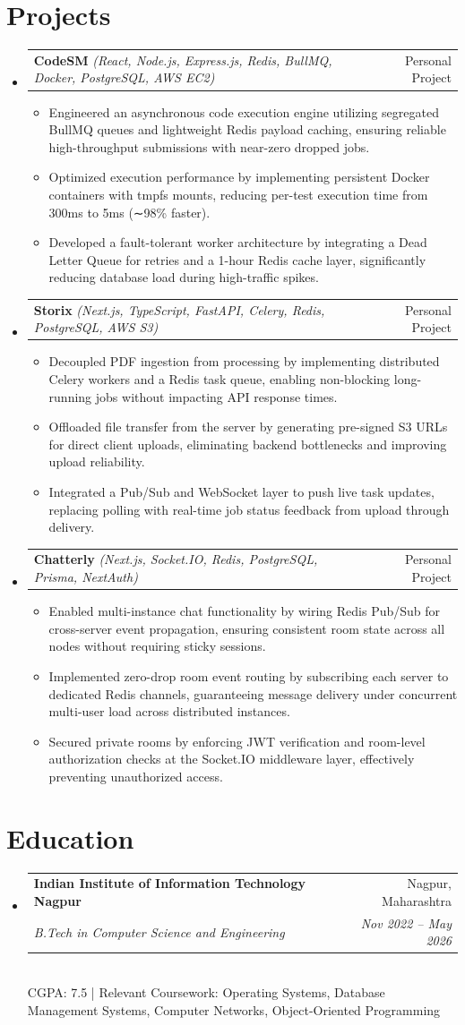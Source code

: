 \documentclass[letterpaper,10pt]{article}
\makeatletter
\newenvironment{resumeList}{
  \begin{itemize}[leftmargin=0.15in, label={}]
}{
  \end{itemize}
}
\newcommand{\resumeItem}[1]{
  \item\small{
    {#1 \vspace{-2.5pt}}
  }
}
\newcommand{\resumeSubheading}[4]{
  \vspace{-2pt}\item
    \begin{tabular*}{0.97\textwidth}[t]{l@{\extracolsep{\fill}}r}
      \textbf{#1} & #2 \\
      \textit{\small#3} & \textit{\small #4} \\
    \end{tabular*}\vspace{-6pt}
}
\newcommand{\resumeProjectHeading}[3]{
  \vspace{-2pt}\item
    \begin{tabular*}{0.97\textwidth}[t]{l@{\extracolsep{\fill}}r}
      \textbf{#1} \textit{\small(#2)} & #3 \\
    \end{tabular*}\vspace{-6pt}
}
\newcommand{\resumeItemListStart}{\begin{itemize}[leftmargin=0.15in]}
\newcommand{\resumeItemListEnd}{\end{itemize}\vspace{-5pt}}
\makeatother
\begin{document}
\section{Projects}
\begin{resumeList}
    \resumeProjectHeading
    {CodeSM}{React, Node.js, Express.js, Redis, BullMQ, Docker, PostgreSQL, AWS EC2}{Personal Project}
  \resumeItemListStart
    \resumeItem{Engineered an asynchronous code execution engine utilizing segregated BullMQ queues and lightweight Redis payload caching, ensuring reliable high-throughput submissions with near-zero dropped jobs.}
    \resumeItem{Optimized execution performance by implementing persistent Docker containers with tmpfs mounts, reducing per-test execution time from 300ms to 5ms (∼98\% faster).}
    \resumeItem{Developed a fault-tolerant worker architecture by integrating a Dead Letter Queue for retries and a 1-hour Redis cache layer, significantly reducing database load during high-traffic spikes.}
  \resumeItemListEnd

  \resumeProjectHeading
    {Storix}{Next.js, TypeScript, FastAPI, Celery, Redis, PostgreSQL, AWS S3}{Personal Project}
  \resumeItemListStart
    \resumeItem{Decoupled PDF ingestion from processing by implementing distributed Celery workers and a Redis task queue, enabling non-blocking long-running jobs without impacting API response times.}
    \resumeItem{Offloaded file transfer from the server by generating pre-signed S3 URLs for direct client uploads, eliminating backend bottlenecks and improving upload reliability.}
    \resumeItem{Integrated a Pub/Sub and WebSocket layer to push live task updates, replacing polling with real-time job status feedback from upload through delivery.}
  \resumeItemListEnd

  \resumeProjectHeading
    {Chatterly}{Next.js, Socket.IO, Redis, PostgreSQL, Prisma, NextAuth}{Personal Project}
  \resumeItemListStart
    \resumeItem{Enabled multi-instance chat functionality by wiring Redis Pub/Sub for cross-server event propagation, ensuring consistent room state across all nodes without requiring sticky sessions.}
    \resumeItem{Implemented zero-drop room event routing by subscribing each server to dedicated Redis channels, guaranteeing message delivery under concurrent multi-user load across distributed instances.}
    \resumeItem{Secured private rooms by enforcing JWT verification and room-level authorization checks at the Socket.IO middleware layer, effectively preventing unauthorized access.}
  \resumeItemListEnd
\end{resumeList}

\section{Education}
\begin{resumeList}
    \resumeSubheading
    {Indian Institute of Information Technology Nagpur}{Nagpur, Maharashtra}
    {B.Tech in Computer Science and Engineering}{Nov 2022 – May 2026}
    \vspace{2pt}\\
    \small{CGPA: 7.5 | Relevant Coursework: Operating Systems, Database Management Systems, Computer Networks, Object-Oriented Programming}
\end{resumeList}
\end{document}
